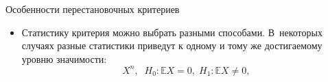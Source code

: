 \documentclass[11pt,pdf,utf8,hyperref={unicode},aspectratio=169]{beamer}
\begin{document}
\begin{frame}{Особенности перестановочных критериев}
 \begin{itemize}
 \item Статистику критерия можно выбрать разными способами. В~некоторых случаях разные статистики приведут к одному и тому же достигаемому уровню значимости:
 $$X^n, \;\; H_0\colon \mathbb{E}X = 0, \; H_1\colon \mathbb{E}X \neq 0,$$

\end{itemize}
\end{frame}
\end{document}

